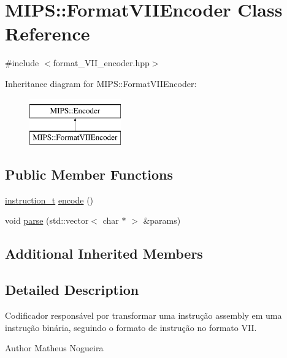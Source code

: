 \hypertarget{classMIPS_1_1FormatVIIEncoder}{}\section{M\+I\+PS\+:\+:Format\+V\+I\+I\+Encoder Class Reference}
\label{classMIPS_1_1FormatVIIEncoder}


{\ttfamily \#include $<$format\+\_\+\+V\+I\+I\+\_\+encoder.\+hpp$>$}

Inheritance diagram for M\+I\+PS\+:\+:Format\+V\+I\+I\+Encoder\+:\begin{figure}[H]
\begin{center}
\leavevmode
\includegraphics[height=2.000000cm]{classMIPS_1_1FormatVIIEncoder}
\end{center}
\end{figure}
\subsection*{Public Member Functions}
\begin{DoxyCompactItemize}
\item 
\hyperlink{core_8hpp_aa514fd240a0e29abb2a2e4c805d7f1a4}{instruction\+\_\+t} \hyperlink{classMIPS_1_1FormatVIIEncoder_a2afcc51d8983491e39d145766639b995}{encode} ()
\item 
void \hyperlink{classMIPS_1_1FormatVIIEncoder_a67272c7aad39c6f49c4aa162119215ba}{parse} (std\+::vector$<$ char $\ast$ $>$ \&params)
\end{DoxyCompactItemize}
\subsection*{Additional Inherited Members}


\subsection{Detailed Description}
Codificador responsável por transformar uma instrução assembly em uma instrução binária, seguindo o formato de instrução no formato V\+II.

\begin{DoxyAuthor}{Author}
Matheus Nogueira 
\end{DoxyAuthor}


